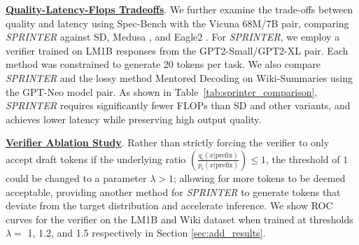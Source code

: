\documentclass{article}
\newcommand{\revision}[1]{{\color{black} #1}}
\theoremstyle{plain}
\theoremstyle{definition}
\theoremstyle{remark}
\begin{document}
\revision{
\noindent\textbf{\underline{Quality-Latency-Flops Tradeoffs}}.
We further examine the trade-offs between quality and latency using Spec-Bench \cite{xia-etal-2024-unlocking} with the Vicuna 68M/7B pair, comparing \textit{SPRINTER} against SD, Medusa \cite{cai2024medusa}, and Eagle2 \cite{li2406eagle}. For \textit{SPRINTER}, we employ a verifier trained on LM1B responses from the GPT2-Small/GPT2-XL pair. Each method was constrained to generate 20 tokens per task. We also compare \textit{SPRINTER} and the lossy method Mentored Decoding \cite{tranthien2024mentored} on Wiki-Summaries using the GPT-Neo model pair. As shown in Table~\ref{tab:sprinter_comparison}, \textit{SPRINTER} requires significantly fewer FLOPs than SD and other variants, and achieves lower latency while preserving high output quality.








\textbf{\underline{Verifier Ablation Study}}. 
Rather than strictly forcing the verifier to only accept draft tokens if the underlying ratio $\left(\frac{q_i(x|\text{prefix})}{p_i(x|\text{prefix})}\right) \leq 1$, the threshold of $1$ could be changed to a parameter $\lambda>1$; allowing for more tokens to be deemed acceptable, providing another method for \textit{SPRINTER} to generate tokens that deviate from the target distribution and accelerate inference. 
We show ROC curves for the verifier on the LM1B and Wiki dataset when trained at thresholds $\lambda = $ 1, 1.2, and 1.5 respectively in Section \ref{sec:add_results}.


}
\end{document}
